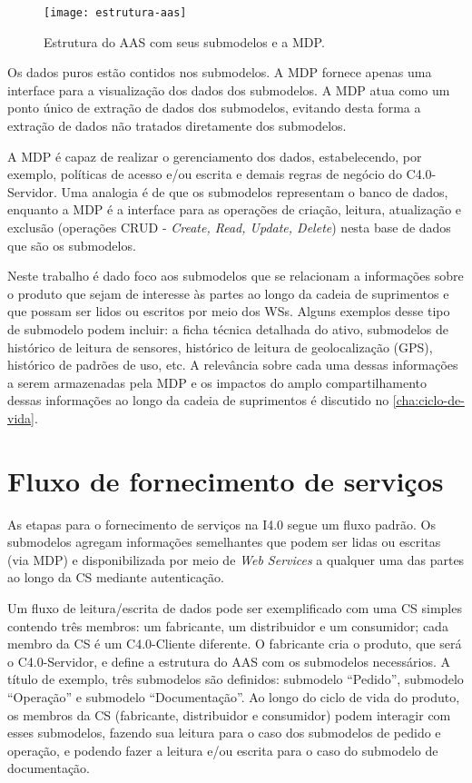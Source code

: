 \begin{figure}[htb]
	\centering
	\texttt{[image: estrutura-aas]}
	\caption{Estrutura do AAS com seus submodelos e a MDP.}
	\label{fig:estrutura-aas}
\end{figure}

Os dados puros estão contidos nos submodelos. A MDP fornece apenas uma interface para a visualização dos dados dos submodelos. A MDP atua como um ponto único de extração de dados dos submodelos, evitando desta forma a extração de dados não tratados diretamente dos submodelos.

A MDP é capaz de realizar o gerenciamento dos dados, estabelecendo, por exemplo, políticas de acesso e/ou escrita e demais regras de negócio do C4.0-Servidor. Uma analogia é de que os submodelos representam o banco de dados, enquanto a MDP é a interface para as operações de criação, leitura, atualização e exclusão (operações CRUD - \textit{Create, Read, Update, Delete}) nesta base de dados que são os submodelos.

Neste trabalho é dado foco aos submodelos que se relacionam a informações sobre o produto que sejam de interesse às partes ao longo da cadeia de suprimentos e que possam ser lidos ou escritos por meio dos WSs. Alguns exemplos desse tipo de submodelo podem incluir: a ficha técnica detalhada do ativo, submodelos de histórico de leitura de sensores, histórico de leitura de geolocalização (GPS), histórico de padrões de uso, etc. A relevância sobre cada uma dessas informações a serem armazenadas pela MDP e os impactos do amplo compartilhamento dessas informações ao longo da cadeia de suprimentos é discutido no \autoref{cha:ciclo-de-vida}.

\section{Fluxo de fornecimento de serviços}

As etapas para o fornecimento de serviços na I4.0 segue um fluxo padrão. Os submodelos agregam informações semelhantes que podem ser lidas ou escritas (via MDP) e disponibilizada por meio de \textit{Web Services} a qualquer uma das partes ao longo da CS mediante autenticação.

Um fluxo de leitura/escrita de dados pode ser exemplificado com uma CS simples contendo três membros: um fabricante, um distribuidor e um consumidor; cada membro da CS é um C4.0-Cliente diferente. O fabricante cria o produto, que será o C4.0-Servidor, e define a estrutura do AAS com os submodelos necessários. A título de exemplo, três submodelos são definidos: submodelo ``Pedido'', submodelo ``Operação'' e submodelo ``Documentação''. Ao longo do ciclo de vida do produto, os membros da CS (fabricante, distribuidor e consumidor) podem interagir com esses submodelos, fazendo sua leitura para o caso dos submodelos de pedido e operação, e podendo fazer a leitura e/ou escrita para o caso do submodelo de documentação.

